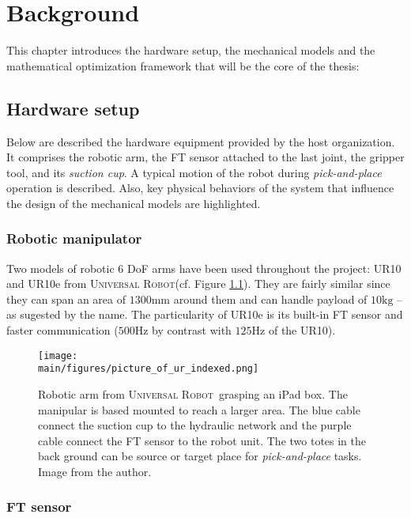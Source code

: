\documentclass[/home/francois/latex/report/main.tex]{subfiles}
\begin{document}
\chapter{Background}
\label{chapter:background}

This chapter introduces the hardware setup, the mechanical models and the mathematical optimization framework that will be the core of the thesis:

\section{Hardware setup}
\label{section:hardware}

Below are described the hardware equipment provided by the host organization. It comprises the robotic arm, the \ac{FT} sensor attached to the last joint, the gripper tool, and its \textit{suction cup}. A typical motion of the robot during \textit{pick-and-place} operation is described. Also, key physical behaviors of the system that influence the design of the mechanical models are highlighted.

\subsection{Robotic manipulator}

Two models of robotic 6 \ac{DoF} arms have been used throughout the project: UR10 and UR10e from \textsc{Universal Robot}\texttrademark (cf. Figure \ref{fig:background:albert}). They are fairly similar since they can span an area of $1300 \si{\milli\meter}$ around them and can handle payload of $10 \si{\kilo\gram}$ –as sugested by the name. The particularity of UR10e is its built-in \ac{FT} sensor and faster communication ($500 \si{\hertz}$ by contrast with $125 \si{\hertz}$ of the UR10).

\begin{figure}
  \centering
  \texttt{[image: \\main/figures/picture\_of\_ur\_indexed.png]}
  \caption{Robotic arm from \textsc{Universal Robot}\texttrademark \ grasping an iPad box. The manipular is based mounted to reach a larger area. The blue cable connect the suction cup to the hydraulic network and the purple cable connect the \ac{FT} sensor to the robot unit. The two totes in the back ground can be source or target place for \textit{pick-and-place} tasks. Image from the author.}
  \label{fig:background:albert}
\end{figure}

\subsection{\ac{FT} sensor}
\end{document}
